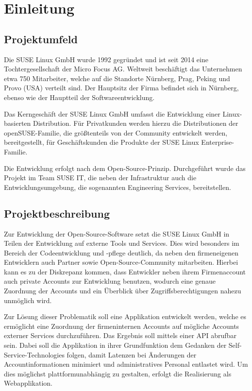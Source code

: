 \section{Einleitung}
\label{sec:Einleitung}

\subsection{Projektumfeld}
\label{sec:Projektumfeld}
Die SUSE Linux GmbH wurde 1992 gegründet und ist seit 2014 eine Tochtergesellschaft der Micro Focus
AG. Weltweit beschäftigt das Unternehmen etwa 750 Mitarbeiter, welche auf die Standorte Nürnberg,
Prag, Peking und Provo (USA) verteilt sind. Der Hauptsitz der Firma befindet sich in Nürnberg,
ebenso wie der Hauptteil der Softwareentwicklung.

Das Kerngeschäft der SUSE Linux GmbH umfasst die Entwicklung einer Linux-basierten Distribution.
Für Privatkunden werden hierzu die Distributionen der openSUSE-Familie, die größtenteils von der
Community entwickelt werden, bereitgestellt, für Geschäftskunden die Produkte der SUSE Linux
Enterprise-Familie.

Die Entwicklung erfolgt nach dem Open-Source-Prinzip.
Durchgeführt wurde das Projekt im Team SUSE IT, die neben der Infrastruktur auch die
Entwicklungsumgebung, die sogenannten Engineering Services, bereitstellen.

\subsection{Projektbeschreibung}
\label{sec:Projektbeschreibung}
Zur Entwicklung der Open-Source-Software setzt die SUSE Linux GmbH in Teilen der Entwicklung
auf externe Tools und Services. Dies wird besonders im Bereich der Codeentwicklung und -pflege
deutlich, da neben den firmeneigenen Entwicklern auch Partner sowie Open-Source-Community
mitarbeiten. Hierbei kann es zu der Diskrepanz kommen, dass Entwickler neben ihrem Firmenaccount
auch private Accounts zur Entwicklung benutzen, wodurch eine genaue Zuordnung der Accounts und
ein Überblick über Zugriffsberechtigungen nahezu unmöglich wird.

Zur Lösung dieser Problematik soll eine Applikation entwickelt werden, welche es ermöglicht
eine Zuordnung der firmeninternen Accounts auf mögliche Accounts externer Services durchzuführen.
Das Ergebnis soll mittels einer API abrufbar sein.
Dabei soll die Applikation in ihrer Grundfunktion dem Gedanken der Self-Service-Technologies folgen,
damit Latenzen bei Änderungen der Accountinformationen minimiert und administratives Personal
entlastet wird. Um dies möglichst plattformunabhängig zu gestalten, erfolgt die Realisierung als
Webapplikation.

